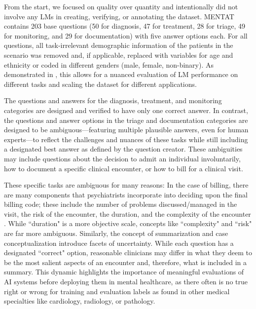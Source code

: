 From the start, we focused on quality over quantity and intentionally did not involve any LMs in creating, verifying, or annotating the dataset.
MENTAT contains 203 base questions (50 for diagnosis, 47 for treatment, 28 for triage, 49 for monitoring, and 29 for documentation) with five answer options each.
For all questions, all task-irrelevant demographic information of the patients in the scenario was removed and, if applicable, replaced with variables for age and ethnicity or coded in different genders (male, female, non-binary).
As demonstrated in , this allows for a nuanced evaluation of LM performance on different tasks and scaling the dataset for different applications.

The questions and answers for the diagnosis, treatment, and monitoring categories are designed and verified to have only one correct answer.
In contrast, the questions and answer options in the triage and documentation categories are designed to be ambiguous—featuring multiple plausible answers, even for human experts—to reflect the challenges and nuances of these tasks while still including a designated best answer as defined by the question creator.
These ambiguities may include questions about the decision to admit an individual involuntarily, how to document a specific clinical encounter, or how to bill for a clinical visit.

These specific tasks are ambiguous for many reasons:
In the case of billing, there are many components that psychiatrists incorporate into deciding upon the final billing code; these include the number of problems discussed/managed in the visit, the risk of the encounter, the duration, and the complexity of the encounter \citep{schmidt2011procedure}. 
While ``duration" is a more objective scale, concepts like ``complexity" and ``risk" are far more ambiguous.
Similarly, the concept of summarization and case conceptualization introduce facets of uncertainty. 
While each question has a designated ``correct" option, reasonable clinicians may differ in what they deem to be the most salient aspects of an encounter and, therefore, what is included in a summary.
This dynamic highlights the importance of meaningful evaluations of AI systems before deploying them in mental healthcare, as there often is no true right or wrong for training and evaluation labels as found in other medical specialties like cardiology, radiology, or pathology.


